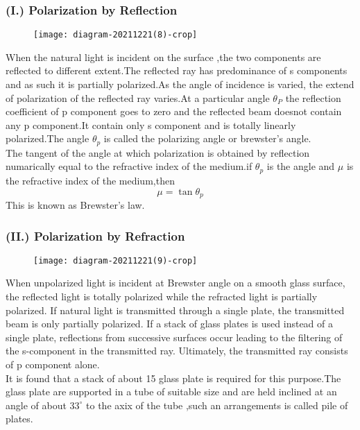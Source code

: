  \subsubsection{(I.) Polarization by Reflection}
 \begin{figure}[H]
 	\centering
 	\texttt{[image: diagram-20211221(8)-crop]}
 	\caption{}
 	\label{}
 \end{figure}
      When the natural light is incident on the surface ,the two components are reflected to different extent.The reflected ray has predominance of s components and as such it is partially polarized.As the angle of incidence is varied, the extend of polarization of the reflected ray varies.At a particular angle $\theta_P$ the reflection  coefficient of p component goes to zero and the reflected beam doesnot contain any p component.It contain only s component and is totally linearly polarized.The angle $\theta_p$ is called the polarizing angle or brewster's angle.\\
      The tangent of the angle at which polarization is obtained by reflection numarically equal to the refractive index of the medium.if $\theta_p$ is the angle and $\mu$ is the refractive index of the medium,then 
      $$\mu=\tan \theta_p$$
      This is known as Brewster's law.
       \subsubsection{(II.) Polarization by Refraction}
      \begin{figure}[H]
      	\centering
      	\texttt{[image: diagram-20211221(9)-crop]}
      	\caption{}
      	\label{}
      \end{figure}
      When unpolarized light is incident at Brewster angle on a smooth glass surface, the reflected light is totally polarized while the refracted light is partially polarized. If natural light is transmitted through a single plate, the transmitted beam is only partially polarized. If a stack of glass plates is used instead of a single plate, reflections from successive surfaces occur leading to the filtering of the s-component in the transmitted ray. Ultimately, the transmitted ray consists of p component alone.\\
      It is found that a stack of about 15 glass plate is required for this purpose.The glass plate are supported in a tube of suitable size and are held inclined at an angle of about $33^{\circ}$ to the axix of the tube ,such an arrangements is called pile of plates.
